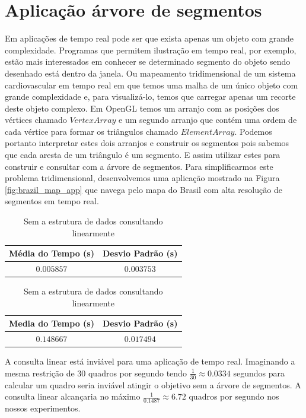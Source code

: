 \section{Aplicação árvore de segmentos}\label{cap:application-segment}
Em aplicações de tempo real pode ser que exista apenas um objeto com grande complexidade. Programas que permitem ilustração em tempo real, por exemplo, estão mais interessados em conhecer se determinado segmento do objeto sendo desenhado está dentro da janela. Ou mapeamento tridimensional de um sistema cardiovascular em tempo real em que temos uma malha de um único objeto com grande complexidade e, para visualizá-lo, temos que carregar apenas um recorte deste objeto complexo. Em OpenGL \cite{opengl} temos um arranjo com as posições dos vértices chamado $Vertex Array$ e um segundo arranjo que contém uma ordem de cada vértice para formar os triângulos chamado $Element Array$. Podemos portanto interpretar estes dois arranjos e construir os segmentos pois sabemos que cada aresta de um triângulo é um segmento. E assim utilizar estes para construir e consultar com a árvore de segmentos. Para simplificarmos este problema tridimensional, desenvolvemos uma aplicação mostrado na Figura \ref{fig:brazil_map_app} que navega pelo mapa do Brasil com alta resolução de segmentos em tempo real. 

\begin{table}[h!]
\centering
\parbox{.5\linewidth}{
\centering
\begin{tabular}{| c c |} 
 \hline
 Média do Tempo (s) & Desvio Padrão (s) \\%
 \hline
 $0.005857$  & $0.003753$ \\
\hline
\end{tabular}
\caption{Utilizando a estrutura de dados para consultar os segmentos}
\label{table:1}
}
\parbox{.5\linewidth}{
\centering
\begin{tabular}{| c c |} 
 \hline
 Media do Tempo (s) & Desvio Padrão (s) \\%
 \hline
 $0.148667$  & $0.017494$ \\
\hline
\end{tabular}
\caption{Sem a estrutura de dados consultando linearmente}
\label{table:1}
}
\end{table}

A consulta linear está inviável para uma aplicação de tempo real. Imaginando a mesma restrição de 30 quadros por segundo tendo $\frac{1}{30} \approx 0.0334$ segundos para calcular um quadro seria inviável atingir o objetivo sem a árvore de segmentos. A consulta linear alcançaria no máximo $\frac{1}{0.1487} \approx 6.72$ quadros por segundo nos nossos experimentos.
